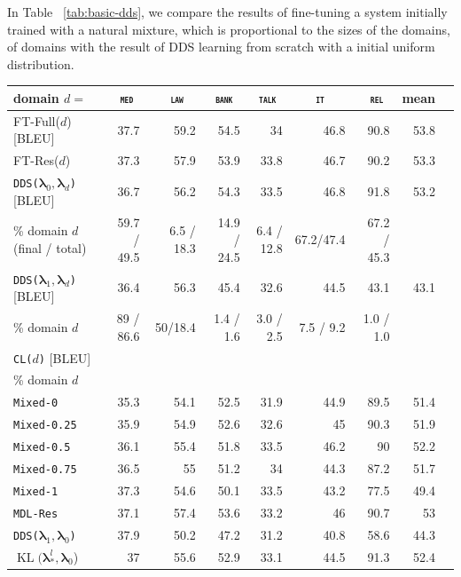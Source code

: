 \documentclass[11pt,a4paper]{article}
\newcommand{\fyTodo}[1]{\Todo[FY:]{\textcolor{orange}{#1}}}
\newcommand{\domain}[1]{\texttt{\textsc{#1}}}
\newcommand{\system}[1]{\texttt{{#1}}}
\newcommand{\vlambda}{\ensuremath{\boldsymbol\lambda}\xspace} %
\begin{document}
\fyTodo{Fix the table}
In Table ~\ref{tab:basic-dds}, we compare the results of fine-tuning a system initially trained with a natural mixture, which is proportional to the sizes of the domains, of domains with the result of DDS learning from scratch with a initial uniform distribution.

\begin{table}
  \centering \small
  \begin{tabular}{|l|*8{r|}} \hline
    domain \hfill $d=$ & \multicolumn{1}{c|}{\domain{ med}} & \multicolumn{1}{c|}{\domain{ law}} & \multicolumn{1}{c|}{\domain{bank}} & \multicolumn{1}{c|}{\domain{talk}} & \multicolumn{1}{c|}{\domain{ it }} & \multicolumn{1}{c|}{\domain{ rel}} & \multicolumn{1}{c|}{mean} \\ \hline
    FT-Full($d$) \hfill [BLEU] &37.7&59.2&54.5&34&46.8&90.8&53.8\\
    FT-Res($d$) \hfill &37.3&57.9&53.9&33.8&46.7&90.2&53.3\\ \hline
    \hline
    \system{DDS($\vlambda_0, \vlambda_d$)} \hfill [BLEU] &36.7&56.2&54.3&33.5&46.8&91.8&53.2\\
    \% domain $d$ (final / total) & 59.7 / 49.5 & 6.5 / 18.3 & 14.9 / 24.5 & 6.4 / 12.8 & 67.2/47.4 & 67.2 / 45.3&\\ \hline
    \system{DDS($\vlambda_1, \vlambda_d$)} \hfill [BLEU]&36.4&56.3& 45.4& 32.6&44.5&43.1&43.1\\
    \% domain $d$& 89 / 86.6 & 50/18.4 & 1.4 / 1.6 & 3.0 / 2.5 & 7.5 / 9.2 & 1.0 / 1.0 \\ \hline
    \system{CL($d$)} \hfill [BLEU]&  \\ 
    \% domain $d$& \\ \hline\hline
    \system{Mixed-0}      & 35.3 & 54.1 & 52.5 & 31.9 & 44.9 & 89.5& 51.4 \\
    \system{Mixed-0.25} & 35.9 & 54.9 & 52.6 & 32.6 & 45 & 90.3& 51.9 \\
    \system{Mixed-0.5}   & 36.1 & 55.4 & 51.8 & 33.5 & 46.2 & 90 & 52.2 \\
    \system{Mixed-0.75} & 36.5 & 55 & 51.2 & 34 & 44.3 & 87.2& 51.7 \\
    \system{Mixed-1}     & 37.3  & 54.6 & 50.1 & 33.5 & 43.2 & 77.5& 49.4 \\
    \system{MDL-Res} &37.1&57.4&53.6&33.2&46&90.7&53\\\hline
    \system{DDS($\vlambda_1, \vlambda_0$)} &37.9&50.2&47.2&31.2&40.8&58.6&44.3\\
    $\operatorname{KL}(\vlambda_*^{l}, \vlambda_0$) &37&55.6&52.9&33.1&44.5&91.3&52.4 \\

\end{tabular}
\end{table}
\end{document}
